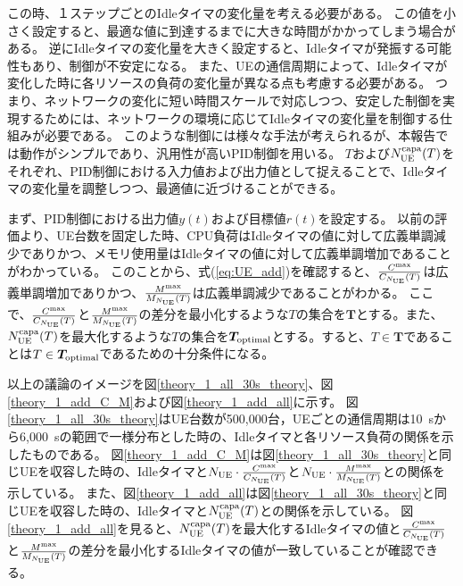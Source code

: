 \documentclass[a4j]{ujarticle}
\begin{document}
この時、１ステップごとのIdleタイマの変化量を考える必要がある。
この値を小さく設定すると、最適な値に到達するまでに大きな時間がかかってしまう場合がある。
逆にIdleタイマの変化量を大きく設定すると、Idleタイマが発振する可能性もあり、制御が不安定になる。
また、UEの通信周期によって、Idleタイマが変化した時に各リソースの負荷の変化量が異なる点も考慮する必要がある。
つまり、ネットワークの変化に短い時間スケールで対応しつつ、安定した制御を実現するためには、ネットワークの環境に応じてIdleタイマの変化量を制御する仕組みが必要である。
このような制御には様々な手法が考えられるが、本報告では動作がシンプルであり、汎用性が高いPID制御を用いる。
$T$および$N_{\rm UE}^{\rm capa}(T)$をそれぞれ、PID制御における入力値および出力値として捉えることで、Idleタイマの変化量を調整しつつ、最適値に近づけることができる。

まず、PID制御における出力値$y(t)$および目標値$r(t)$を設定する。
以前の評価より、UE台数を固定した時、CPU負荷はIdleタイマの値に対して広義単調減少でありかつ、メモリ使用量はIdleタイマの値に対して広義単調増加であることがわかっている。
このことから、式(\ref{eq:UE_add})を確認すると、$\frac{C^{\rm max}}{C_{N_{\rm UE}}(T)}$は広義単調増加でありかつ、$\frac{M^{\rm max}}{M_{N_{\rm UE}}(T)}$は広義単調減少であることがわかる。
ここで、$\frac{C^{\rm max}}{C_{N_{\rm UE}}(T)}$と$\frac{M^{\rm max}}{M_{N_{\rm UE}}(T)}$の差分を最小化するような$T$の集合を$\bm{T}$とする。また、$N_{\rm UE}^{\rm capa}(T)$を最大化するような$T$の集合を$\bm{T}_{\rm optimal}$とする。すると、$T\in\bm{T}$であることは$T\in\bm{T}_{\rm optimal}$であるための十分条件になる。

以上の議論のイメージを図\ref{theory_1_all_30s_theory}、図\ref{theory_1_add_C_M}および図\ref{theory_1_add_all}に示す。
図\ref{theory_1_all_30s_theory}はUE台数が500,000台，UEごとの通信周期は10~sから6,000~sの範囲で一様分布とした時の、Idleタイマと各リソース負荷の関係を示したものである。
図\ref{theory_1_add_C_M}は図\ref{theory_1_all_30s_theory}と同じUEを収容した時の、Idleタイマと$N_{\rm UE} \cdot \frac{C^{\rm max}}{C_{N_{\rm UE}}(T)}$と$N_{\rm UE} \cdot \frac{M^{\rm max}}{M_{N_{\rm UE}}(T)}$との関係を示している。
また、図\ref{theory_1_add_all}は図\ref{theory_1_all_30s_theory}と同じUEを収容した時の、Idleタイマと$N_{\rm UE}^{\rm capa}(T)$との関係を示している。
図\ref{theory_1_add_all}を見ると、$N_{\rm UE}^{\rm capa}(T)$を最大化するIdleタイマの値と$\frac{C^{\rm max}}{C_{N_{\rm UE}}(T)}$と$\frac{M^{\rm max}}{M_{N_{\rm UE}}(T)}$の差分を最小化するIdleタイマの値が一致していることが確認できる。
\end{document}
